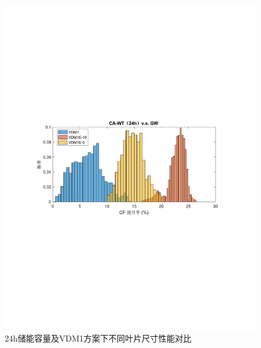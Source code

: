 \begin{figure}[H] %
  \centering
  \includegraphics[scale=0.75]{figures/Chap5-CA-WT-24h-VS-GW-VDM1E.pdf}
  \caption{24h储能容量及VDM1方案下不同叶片尺寸性能对比}
  \label{fig:CA-WT-24h-VS-GW-VDM1E}
\end{figure}

